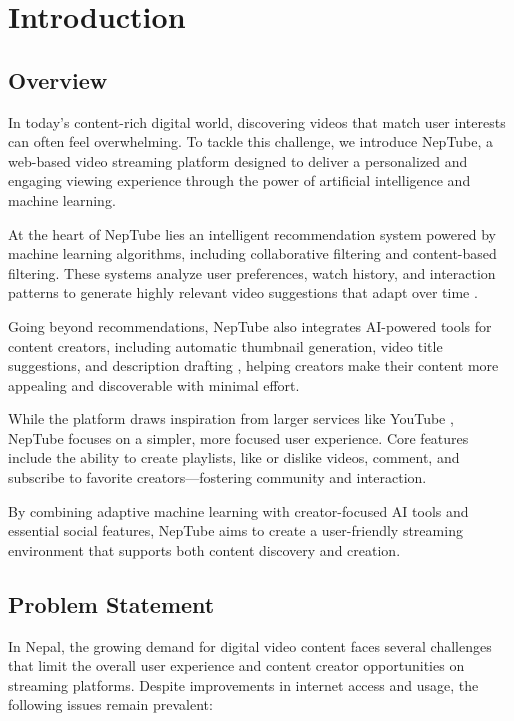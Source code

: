 \chapter{Introduction}

\section{Overview}

In today's content-rich digital world, discovering videos that match user interests can often feel overwhelming. To tackle this challenge, we introduce NepTube, a web-based video streaming platform designed to deliver a personalized and engaging viewing experience through the power of artificial intelligence and machine learning.

At the heart of NepTube lies an intelligent recommendation system powered by machine learning algorithms, including collaborative filtering \cite{koren2009matrix} and content-based filtering. These systems analyze user preferences, watch history, and interaction patterns to generate highly relevant video suggestions that adapt over time \cite{he2017neural}.

Going beyond recommendations, NepTube also integrates AI-powered tools for content creators, including automatic thumbnail generation, video title suggestions, and description drafting \cite{dugan2025genai}, helping creators make their content more appealing and discoverable with minimal effort.

While the platform draws inspiration from larger services like YouTube \cite{elinext2025ai}, NepTube focuses on a simpler, more focused user experience. Core features include the ability to create playlists, like or dislike videos, comment, and subscribe to favorite creators---fostering community and interaction.

By combining adaptive machine learning with creator-focused AI tools and essential social features, NepTube aims to create a user-friendly streaming environment that supports both content discovery and creation.

\section{Problem Statement}

In Nepal, the growing demand for digital video content faces several challenges that limit the overall user experience and content creator opportunities on streaming platforms. Despite improvements in internet access and usage, the following issues remain prevalent:


